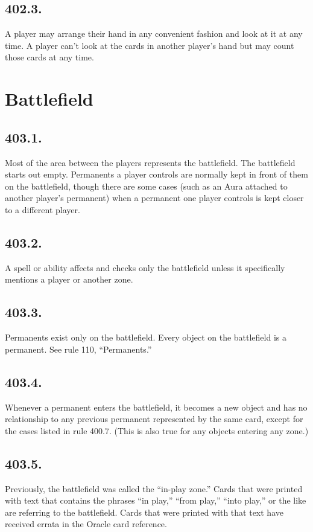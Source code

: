 \subsection*{402.3.}
A player may arrange their hand in any convenient fashion and look at it at any time. A player can’t look at the cards in another player’s hand but may count those cards at any time.

\section{Battlefield}
\subsection*{403.1.}
Most of the area between the players represents the battlefield. The battlefield starts out empty. Permanents a player controls are normally kept in front of them on the battlefield, though there are some cases (such as an Aura attached to another player’s permanent) when a permanent one player controls is kept closer to a different player.

\subsection*{403.2.}
A spell or ability affects and checks only the battlefield unless it specifically mentions a player or another zone.

\subsection*{403.3.}
Permanents exist only on the battlefield. Every object on the battlefield is a permanent. See rule 110, “Permanents.”

\subsection*{403.4.}
Whenever a permanent enters the battlefield, it becomes a new object and has no relationship to any previous permanent represented by the same card, except for the cases listed in rule 400.7. (This is also true for any objects entering any zone.)

\subsection*{403.5.}
Previously, the battlefield was called the “in-play zone.” Cards that were printed with text that contains the phrases “in play,” “from play,” “into play,” or the like are referring to the battlefield. Cards that were printed with that text have received errata in the Oracle card reference.

